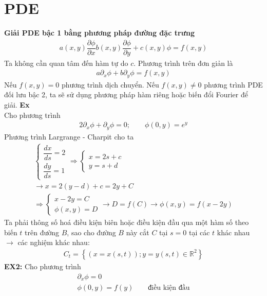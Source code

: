 \documentclass{article}
\newcommand{\f}[2]{\dfrac{#1}{#2}}
\begin{document}
\section{PDE}
\textbf{Giải PDE bậc 1 bằng phương pháp đường đặc trưng}
\begin{gather}
	a(x,y)\f{\partial \phi}{\partial x} b(x,y) \f{\partial \phi}{\partial y} + c(x,y) \phi = f(x,y)
\end{gather}
Ta không cần quan tâm đến hàm tự do $c$. Phương trình trên đơn giản là
\begin{gather}
	a \partial_{x} \phi + b \partial_{y} \phi = f(x,y)
\end{gather}
Nếu $f(x,y) = 0$ phương trình dịch chuyển. Nếu $f(x,y) \neq 0$ phương trình PDE đối lưu bậc 2, ta sẽ sử dụng phương pháp hàm riêng hoặc biến đổi Fourier để giải.
\textbf{Ex}\\
Cho phương trình
\begin{gather}
	2 \partial_{x} \phi + \partial_{y} \phi = 0; \quad \quad \phi(0,y) = e^{y}
\end{gather}
Phương trình Largrange - Charpit cho ta
\begin{gather}
	\begin{cases}
		\f{dx}{ds} = 2 \\
		\f{dy}{ds} = 1
	\end{cases}
	\Rightarrow
	\begin{cases}
		x = 2s + c \\
		y = s + d
	\end{cases}\\
	\rightarrow x = 2(y - d) + c = 2y + C\\
	\Rightarrow
	\begin{cases}
		x - 2 y = C \\
		\phi(x,y) = D
	\end{cases}
	\rightarrow D = f(C) \rightarrow \phi(x,y) = f(x-2y)
\end{gather}
Ta phải thông số hoá điều kiện biên hoặc điều kiện đầu qua một hàm số theo biến $t$ trên đường $B$, sao cho đường $B$ này cắt $C$ tại $s = 0$ tại các $t$ khác nhau $\rightarrow$ các nghiệm khác nhau:
\begin{gather}
	C_{t} = \left\{ (x = x(s,t)); y = y(s,t) \in \mathbb{R}^{2} \right\}
\end{gather}
\textbf{EX2:} 
Cho phương trình
\begin{gather}
	\partial_x \phi = 0\\
	\phi(0,y) = f(y) \quad \quad \text{điều kiện đầu}
\end{gather}
\end{document}

